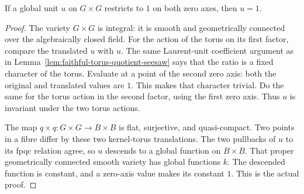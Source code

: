 \begin{srlemma}
\label{lem:faithful-quotient-unit-axes}
If a global unit \(u\) on \(G\times G\) restricts to \(1\)
on both zero axes, then \(u=1\).
\end{srlemma}
\begin{proof}
The variety \(G\times G\) is integral: it is smooth and
geometrically connected over the algebraically closed field.
For the action of the torus on its first factor, compare
the translated \(u\) with \(u\).
The same Laurent-unit coefficient argument as in
Lemma~\ref{lem:faithful-torus-quotient-seesaw} says that
the ratio is a fixed character of the torus.
Evaluate at a point of the second zero axis:
both the original and translated values are \(1\).
This makes that character trivial.
Do the same for the torus action in the second factor,
using the first zero axis.
Thus \(u\) is invariant under the two torus actions.

The map \(q\times q:G\times G\to B\times B\) is flat,
surjective, and quasi-compact.  Two points in a fibre
differ by these two kernel-torus translations.
The two pullbacks of \(u\) to its fpqc relation agree,
so \(u\) descends to a global function on \(B\times B\).
That proper geometrically connected smooth variety has
global functions \(k\).  The descended function is constant,
and a zero-axis value makes its constant \(1\).
This is the actual  proof.
\end{proof}

